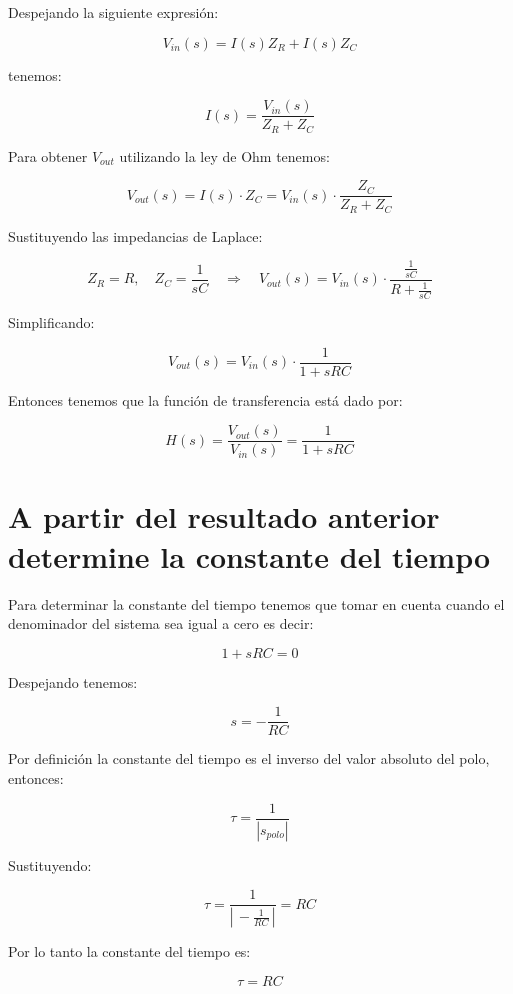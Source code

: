 \documentclass[12pt, letterpaper]{article}
\begin{document}
Despejando la siguiente expresión:

\[
V_{in}(s) = I(s)Z_R + I(s)Z_C
\]

tenemos:

\[
I(s) = \frac{V_{in}(s)}{Z_R + Z_C}
\]

Para obtener \(V_{out}\) utilizando la ley de Ohm tenemos:

\[
V_{out}(s) = I(s) \cdot Z_C = V_{in}(s)\cdot \frac{Z_C}{Z_R + Z_C}
\]

Sustituyendo las impedancias de Laplace:

\[
Z_R = R, \quad Z_C = \frac{1}{sC} \quad \Rightarrow \quad V_{out}(s) = V_{in}(s) \cdot \frac{\frac{1}{sC}}{R + \frac{1}{sC}}
\]

Simplificando:

\[
V_{out}(s) = V_{in}(s) \cdot \frac{1}{1 + sRC}
\]

Entonces tenemos que la función de transferencia está dado por:

\begin{center}
    \begin{tcolorbox}[colframe=red!80!black, width=8cm, sharp corners]
        \[
        H(s) = \frac{V_{out}(s)}{V_{in}(s)} = \frac{1}{1 + sRC}
        \]
    \end{tcolorbox}
\end{center}

\section{A partir del resultado anterior determine la constante del tiempo}

Para determinar la constante del tiempo tenemos que tomar en cuenta cuando el denominador del sistema sea igual a cero es decir:
 
\[
1 + sRC = 0
\]

Despejando tenemos:

\[
s = - \frac{1}{RC}
\]

Por definición la constante del tiempo es el inverso del valor absoluto del polo, entonces:

\[
\tau = \frac{1}{|s_{polo}|}
\]

Sustituyendo:

\[
\tau = \frac{1}{|\,-\frac{1}{RC}\,|} = RC
\]

Por lo tanto la constante del tiempo es:

\begin{center}
    \begin{tcolorbox}[colframe=red!80!black, width=4.5cm, sharp corners]
        \[
        \tau = RC
        \]
    \end{tcolorbox}
\end{center}
\end{document}
